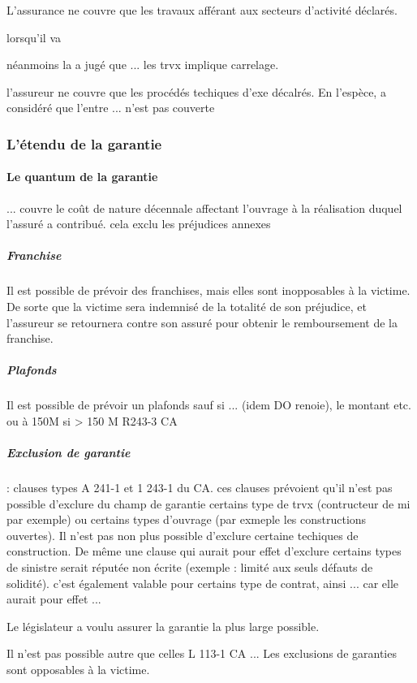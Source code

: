 			L'assurance ne couvre que les travaux afférant aux secteurs d'activité déclarés.

			lorsqu'il va

			néanmoins la \CourDeCas a jugé que ... les trvx implique carrelage.

			l'assureur ne couvre que les procédés techiques d'exe décalrés. En l'espèce, \civTrois* a considéré que l'entre ... n'est pas couverte

		\subsubsection{L'étendu de la garantie}

			\paragraph{Le quantum de la garantie}

				... couvre le coût de nature décennale affectant l'ouvrage à la réalisation duquel l'assuré a contribué. cela exclu les préjudices annexes

				\subparagraph{Franchise}\label{rcFranchise} Il est possible de prévoir des franchises, mais elles sont inopposables à la victime.
				De sorte que la victime sera indemnisé de la totalité de son préjudice, et l'assureur se retournera contre son assuré pour obtenir le remboursement de la franchise.

				\subparagraph{Plafonds} Il est possible de prévoir un plafonds sauf si ... (idem DO renoie), le montant etc. ou à 150M si > 150 M R243-3 CA

				\subparagraph{Exclusion de garantie} : clauses types A 241-1 et 1 243-1 du CA. ces clauses prévoient qu'il n'est pas possible d'exclure du champ de garantie certains type de trvx (contructeur de mi par exemple) ou certains types d'ouvrage (par exmeple les constructions ouvertes). Il n'est pas non plus possible d'exclure certaine techiques de construction. De même une clause qui aurait pour effet d'exclure certains types de sinistre serait réputée non écrite (exemple : limité aux seuls défauts de solidité). c'est également valable pour certains type de contrat, ainsi ... car elle aurait pour effet ...

				Le législateur a voulu assurer la garantie la plus large possible.

				Il n'est pas possible autre que celles L 113-1 CA ... Les exclusions de garanties sont opposables à la victime.

